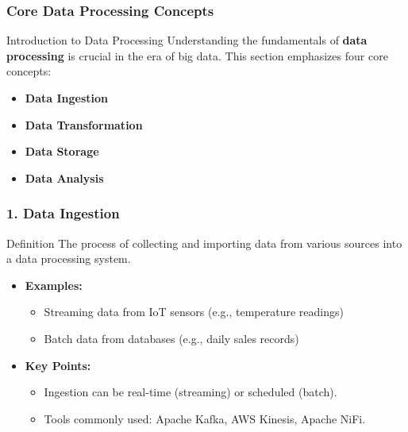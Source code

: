 \documentclass[aspectratio=169]{beamer}
\begin{document}
\begin{frame}[fragile]
    \frametitle{Core Data Processing Concepts}
    \begin{block}{Introduction to Data Processing}
        Understanding the fundamentals of \textbf{data processing} is crucial in the era of big data. This section emphasizes four core concepts: 
        \begin{itemize}
            \item \textbf{Data Ingestion}
            \item \textbf{Data Transformation}
            \item \textbf{Data Storage}
            \item \textbf{Data Analysis}
        \end{itemize}
    \end{block}
\end{frame}

\begin{frame}[fragile]
    \frametitle{1. Data Ingestion}
    \begin{block}{Definition}
        The process of collecting and importing data from various sources into a data processing system.
    \end{block}
    \begin{itemize}
        \item \textbf{Examples:}
        \begin{itemize}
            \item Streaming data from IoT sensors (e.g., temperature readings)
            \item Batch data from databases (e.g., daily sales records)
        \end{itemize}
        \item \textbf{Key Points:}
        \begin{itemize}
            \item Ingestion can be real-time (streaming) or scheduled (batch).
            \item Tools commonly used: Apache Kafka, AWS Kinesis, Apache NiFi.
        \end{itemize}
    \end{itemize}
\end{frame}
\end{document}
